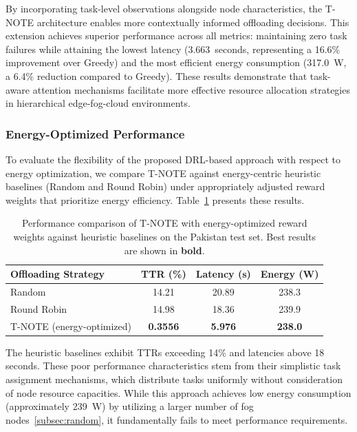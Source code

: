 \documentclass[preprint,3p,authoryear]{elsarticle}
\begin{document}
By incorporating task-level observations alongside node characteristics, the T-NOTE architecture enables more contextually informed offloading decisions. This extension achieves superior performance across all metrics: maintaining zero task failures while attaining the lowest latency (3.663~seconds, representing a 16.6\% improvement over Greedy) and the most efficient energy consumption (317.0~W, a 6.4\% reduction compared to Greedy). These results demonstrate that task-aware attention mechanisms facilitate more effective resource allocation strategies in hierarchical edge-fog-cloud environments.

\subsubsection{Energy-Optimized Performance}\label{sec:energy_consideration}

To evaluate the flexibility of the proposed DRL-based approach with respect to energy optimization, we compare T-NOTE against energy-centric heuristic baselines (Random and Round Robin) under appropriately adjusted reward weights that prioritize energy efficiency. Table~\ref{tab:energy_comparison} presents these results.

\begin{table}[htbp]
\centering
\begin{tabular}{lccc}
\toprule
\textbf{Offloading Strategy} & \textbf{TTR (\%)} & \textbf{Latency (s)} & \textbf{Energy (W)} \\
\midrule
Random 
 & 14.21
 & 20.89
 & 238.3 \\
Round Robin 
 & 14.98
 & 18.36
 & 239.9 \\
\midrule
T-NOTE (energy-optimized)
 & \textbf{0.3556} 
 & \textbf{5.976} 
 & \textbf{238.0} \\
\bottomrule
\end{tabular}
\caption{Performance comparison of T-NOTE with energy-optimized reward weights against heuristic baselines on the Pakistan test set. Best results are shown in \textbf{bold}.}
\label{tab:energy_comparison}
\end{table}

The heuristic baselines exhibit TTRs exceeding 14\% and latencies above 18 seconds. These poor performance characteristics stem from their simplistic task assignment mechanisms, which distribute tasks uniformly without consideration of node resource capacities. While this approach achieves low energy consumption (approximately 239~W) by utilizing a larger number of fog nodes~\ref{subsec:random}, it fundamentally fails to meet performance requirements.
\end{document}
